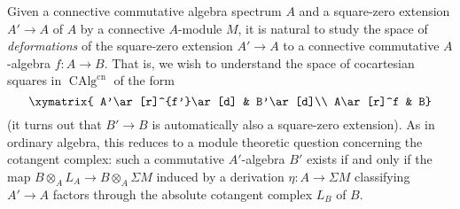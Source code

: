 \documentclass{article}
\theoremstyle{definition}
\DeclareMathOperator{\CAlg}{CAlg}
\newcommand{\cn}{\mathrm{cn}}
\begin{document}
Given a connective commutative algebra spectrum $A$ and a square-zero extension $A'\to A$ of $A$ by a connective $A$-module $M$, it is natural to study the space of {\em deformations} of the square-zero extension $A'\to A$ to a connective commutative $A$-algebra $f:A\to B$.
That is, we wish to understand the space of cocartesian squares in $\CAlg^{\cn}$ of the form
\[
\xymatrix{
A'\ar[r]^{f'}\ar[d] & B'\ar[d]\\
A\ar[r]^f & B}
\]
(it turns out that $B'\to B$ is automatically also a square-zero extension).
As in ordinary algebra, this reduces to a module theoretic question concerning the cotangent complex:
such a commutative $A'$-algebra $B'$ exists if and only if the map $B\otimes_A L_A\to  B\otimes_A\Sigma M$ induced by a derivation $\eta:A\to\Sigma M$ classifying $A'\to A$ factors through the absolute cotangent complex $L_B$ of $B$.
\end{document}
